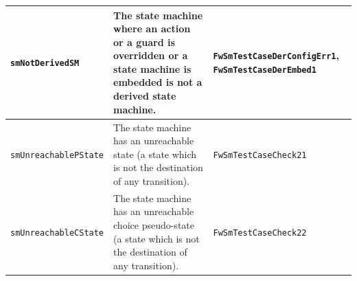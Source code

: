\documentclass[requirements]{../fwprofile}
\begin{document}
\begin{longtable}{|p{3cm}|p{3.7cm}|p{4.5cm}|}
\hline
\texttt{smNotDerivedSM} & The state machine where an action or a guard is overridden or a state machine is embedded is not a derived state machine. 
& \texttt{FwSmTestCaseDerConfigErr1}, \texttt{FwSmTestCaseDerEmbed1} \\
\hline
\texttt{smUnreachablePState} & The state machine has an unreachable state (a state which is not the destination of any transition). 
& \texttt{FwSmTestCaseCheck21} \\
\hline
\texttt{smUnreachableCState} & The state machine has an unreachable choice pseudo-state (a state which is not the destination of any transition). 
& \texttt{FwSmTestCaseCheck22} \\
\hline
\end{longtable}

\end{document}
